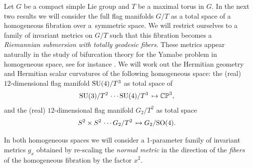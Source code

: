 \documentclass[10pt,a4paper]{amsart}
\numberwithin{equation}{section}
\begin{document}
Let $G$ be a compact simple Lie group and $T$ be a maximal torus in $G$. In the next two results we will consider the full flag manifolds $G/T$ as a total space of a homogeneous fibration over a~symmetric space. We will restrict ourselves to a family of invariant metrics on $G/T$ such that this fibration becomes a {\it Riemannian submersion with totally geodesic fibers}. These metrics appear naturally in the study of bifurcation theory for the Yamabe problem in homogeneous space, see for instance \cite{kenerson}. We will work out the Hermitian geometry and Hermitian scalar curvatures of the following homogeneous space: the (real) $12$-dimensional flag manifold ${\rm SU}(4)/T^3$ as total space of
\begin{gather*}
{\rm SU}(3)/T^2 \, \cdots {\rm SU}(4)/T^3 \, \mapsto \mathbb{CP}^3,
\end{gather*}
and the (real) $12$-dimensional flag manifold $G_2/T^2$ as total space
\begin{gather*}
S^2\times S^2 \, \cdots G_2/T^2 \, \mapsto G_2/{\rm SO}(4).
\end{gather*}

In both homogeneous spaces we will consider a 1-parameter family of invariant metrics $g_x$ obtained by re-scaling the {\it normal metric} in the direction of the {\it fibers} of the homogeneous fibration by the factor $x^2$.
\end{document}
